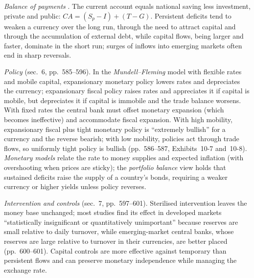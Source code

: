 \begin{qfdefinition}\label{def:flows-policy-exchange-rates}
 \emph{Balance of payments} \citep[chap.~10, sec.~5, pp.~573--584]{economics-investment-decision-makers-2013}. The current account equals national saving less investment, private and public: $CA=(S_p-I)+(T-G)$. Persistent deficits tend to weaken a currency over the long run, through the need to attract capital and through the accumulation of external debt, while capital flows, being larger and faster, dominate in the short run; surges of inflows into emerging markets often end in sharp reversals.

\emph{Policy} (sec.~6, pp.~585--596). In the \emph{Mundell--Fleming} model with flexible rates and mobile capital, expansionary monetary policy lowers rates and depreciates the currency; expansionary fiscal policy raises rates and appreciates it if capital is mobile, but depreciates it if capital is immobile and the trade balance worsens. With fixed rates the central bank must offset monetary expansion (which becomes ineffective) and accommodate fiscal expansion. With high mobility, expansionary fiscal plus tight monetary policy is ``extremely bullish'' for a currency and the reverse bearish; with low mobility, policies act through trade flows, so uniformly tight policy is bullish (pp.~586--587, Exhibits~10-7 and~10-8). \emph{Monetary models} relate the rate to money supplies and expected inflation (with overshooting when prices are sticky); the \emph{portfolio balance} view holds that sustained deficits raise the supply of a country's bonds, requiring a weaker currency or higher yields unless policy reverses.

\emph{Intervention and controls} (sec.~7, pp.~597--601). Sterilised intervention leaves the money base unchanged; most studies find its effect in developed markets ``statistically insignificant or quantitatively unimportant'' because reserves are small relative to daily turnover, while emerging-market central banks, whose reserves are large relative to turnover in their currencies, are better placed (pp.~600--601). Capital controls are more effective against temporary than persistent flows and can preserve monetary independence while managing the exchange rate.


\end{qfdefinition}
